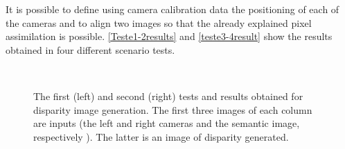     It is possible to define using camera calibration data the positioning of each of the cameras and to align two images so that the already explained pixel assimilation is possible. \autoref{Teste1-2results} and \autoref{teste3-4result} show the results obtained in four different scenario tests.

\begin{figure}[H]
  \centering
  \caption{
    The first (left) and second (right) tests and results obtained for disparity image generation. The first three images of each column are inputs (the left and right cameras and the semantic image, respectively \cite{giovaniThesis}). The latter is an image of disparity generated.}
  \label{Teste1-2results}
  \mbox{%
    \qquad
    }
    \mbox{%
    \qquad
    }
    \mbox{%
    \qquad
}
\end{figure}
